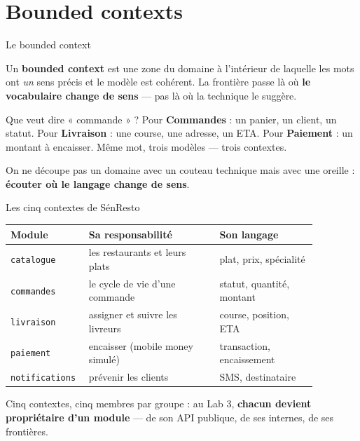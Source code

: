 \documentclass[aspectratio=169,11pt]{beamer}
\begin{document}
\section{Bounded contexts}

\begin{frame}{Le bounded context}
\begin{ucaddef}
{\small Un \textbf{bounded context} est une zone du domaine à l'intérieur de laquelle les mots ont \emph{un} sens précis et le modèle est cohérent. La frontière passe là où \textbf{le vocabulaire change de sens} — pas là où la technique le suggère.}
\end{ucaddef}
\begin{ucadex}
{\small Que veut dire « commande » ? Pour \textbf{Commandes} : un panier, un client, un statut. Pour \textbf{Livraison} : une course, une adresse, un ETA. Pour \textbf{Paiement} : un montant à encaisser. Même mot, trois modèles — trois contextes.}
\end{ucadex}
\begin{ucadret}[À retenir]
{\small On ne découpe pas un domaine avec un couteau technique mais avec une oreille : \textbf{écouter où le langage change de sens}.}
\end{ucadret}
\end{frame}

\begin{frame}{Les cinq contextes de SénResto}
{\small\begin{tabular}{p{0.17\linewidth}p{0.40\linewidth}p{0.30\linewidth}}
\toprule
\textbf{Module} & \textbf{Sa responsabilité} & \textbf{Son langage}\\
\midrule
\texttt{catalogue} & les restaurants et leurs plats & plat, prix, spécialité\\
\texttt{commandes} & le cycle de vie d'une commande & statut, quantité, montant\\
\texttt{livraison} & assigner et suivre les livreurs & course, position, ETA\\
\texttt{paiement} & encaisser (mobile money simulé) & transaction, encaissement\\
\texttt{notifications} & prévenir les clients & SMS, destinataire\\
\bottomrule
\end{tabular}}
\vskip4pt
\begin{ucadrec}
{\small Cinq contextes, cinq membres par groupe : au Lab 3, \textbf{chacun devient propriétaire d'un module} — de son API publique, de ses internes, de ses frontières.}
\end{ucadrec}
\end{frame}
\end{document}
